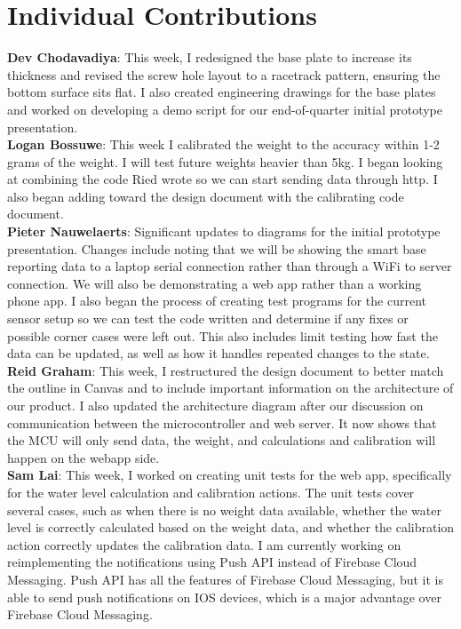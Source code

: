 \documentclass[12pt]{article}
\begin{document}

\section*{Individual Contributions}

\noindent\textbf{Dev Chodavadiya}:
This week, I redesigned the base plate to increase its thickness and revised the screw hole layout to a racetrack pattern, 
ensuring the bottom surface sits flat. I also created engineering drawings for the base plates and worked on developing a 
demo script for our end-of-quarter initial prototype presentation.\\

\noindent\textbf{Logan Bossuwe}:
This week I calibrated the weight to the accuracy within 1-2 grams of the weight. I will test future weights heavier than 5kg. I began looking at combining the code Ried wrote so we can start sending data through http.
I also began adding toward the design document with the calibrating code document. \\

\noindent\textbf{Pieter Nauwelaerts}:
Significant updates to diagrams for the initial prototype presentation. Changes include noting that we will be showing the smart base reporting data to a laptop serial connection rather than through a WiFi to server connection. We will also be demonstrating a web app rather than a working phone app. 
I also began the process of creating test programs for the current sensor setup so we can test the code written and determine if any fixes or possible corner cases were left out. This also includes limit testing how fast the data can be updated, as well as how it handles repeated changes to the state. \\

\noindent\textbf{Reid Graham}:
This week, I restructured the design document to better match the outline in Canvas and to include important information on the architecture of our product.
I also updated the architecture diagram after our discussion on communication between the microcontroller and web server. It now shows that the MCU will only send data, the weight, and calculations and calibration will happen on the webapp side. \\ 

\noindent\textbf{Sam Lai}:
This week, I worked on creating unit tests for the web app, specifically for the water level calculation and calibration actions. 
The unit tests cover several cases, such as when there is no weight data available, whether the water level is correctly calculated 
based on the weight data, and whether the calibration action correctly updates the calibration data. I am currently working on reimplementing 
the notifications using Push API instead of Firebase Cloud Messaging. Push API has all the features of Firebase Cloud Messaging, but 
it is able to send push notifications on IOS devices, which is a major advantage over Firebase Cloud Messaging. \\
\end{document}
